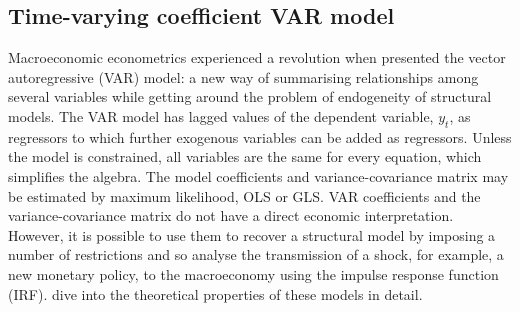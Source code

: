 \subsection{Time-varying coefficient VAR model}

Macroeconomic econometrics experienced a revolution when \citet{Sims1980} presented the vector autoregressive (VAR) model: a new way of summarising relationships among several variables while getting around the problem of endogeneity of structural models. The VAR model has lagged values of the dependent variable, $y_t$, as regressors to which further exogenous variables can be added as regressors. Unless the model is constrained, all variables are the same for every equation, which simplifies the algebra. The model coefficients and variance-covariance matrix may be estimated by maximum likelihood, OLS or GLS. VAR coefficients and the variance-covariance matrix do not have a direct economic interpretation. However, it is possible to use them to recover a structural model by imposing a number of restrictions and so analyse the transmission of a shock, for example, a new monetary policy, to the macroeconomy using the impulse response function (IRF). \citet{Lutkepohl2005} dive into the theoretical properties of these models in detail.

